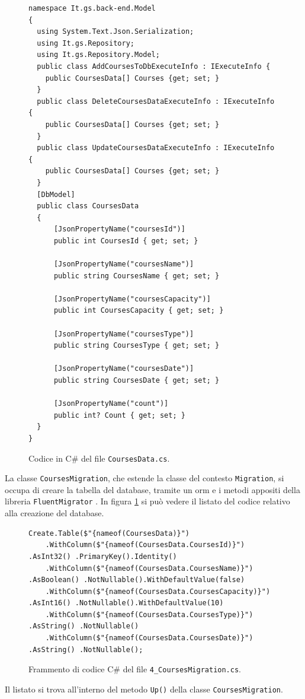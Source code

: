 \begin{figure}[H]
\begin{lstlisting}[linewidth=20cm, captionpos=b]
namespace It.gs.back-end.Model
{
  using System.Text.Json.Serialization;
  using It.gs.Repository;
  using It.gs.Repository.Model;
  public class AddCoursesToDbExecuteInfo : IExecuteInfo {
    public CoursesData[] Courses {get; set; }
  }
  public class DeleteCoursesDataExecuteInfo : IExecuteInfo {
    public CoursesData[] Courses {get; set; }
  }
  public class UpdateCoursesDataExecuteInfo : IExecuteInfo {
    public CoursesData[] Courses {get; set; }
  }
  [DbModel]
  public class CoursesData
  {
      [JsonPropertyName("coursesId")]
      public int CoursesId { get; set; }
    
      [JsonPropertyName("coursesName")]
      public string CoursesName { get; set; }
    
      [JsonPropertyName("coursesCapacity")]
      public int CoursesCapacity { get; set; }
    
      [JsonPropertyName("coursesType")]
      public string CoursesType { get; set; }
    
      [JsonPropertyName("coursesDate")]
      public string CoursesDate { get; set; }
    
      [JsonPropertyName("count")]
      public int? Count { get; set; }
  }
}
\end{lstlisting}
\caption{\label{fig:coursesdata}Codice in C\# del file \texttt{CoursesData.cs}.}
\end{figure}

La classe \texttt{CoursesMigration}, che estende la classe del contesto \texttt{Migration}, si occupa di creare la tabella del database, tramite un \acrshort{orm} \cite{orm} e i metodi appositi della libreria \texttt{FluentMigrator} \cite{fluentmigrator}. In figura \ref{fig:coursesdata} si può vedere il listato del codice relativo alla creazione del database.
\begin{figure}[H]
\begin{lstlisting}
Create.Table($"{nameof(CoursesData)}")
    .WithColumn($"{nameof(CoursesData.CoursesId)}") .AsInt32() .PrimaryKey().Identity()
    .WithColumn($"{nameof(CoursesData.CoursesName)}") .AsBoolean() .NotNullable().WithDefaultValue(false)
    .WithColumn($"{nameof(CoursesData.CoursesCapacity)}") .AsInt16() .NotNullable().WithDefaultValue(10)
    .WithColumn($"{nameof(CoursesData.CoursesType)}") .AsString() .NotNullable()
    .WithColumn($"{nameof(CoursesData.CoursesDate)}") .AsString() .NotNullable();
\end{lstlisting}
\caption{\label{fig:migration}Frammento di codice C\# del file \texttt{4\_CoursesMigration.cs}.}
\end{figure}
Il listato si trova all'interno del metodo \texttt{Up()} della classe \texttt{CoursesMigration}. 

